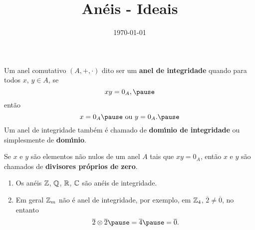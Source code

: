 \documentclass{beamer}
\title{An\'eis - Ideais}
\author[\autor]{\autor}
\institute[\instituto]{\instituto}
\date{\today}
\begin{document}
    \begin{frame}
        \maketitle
    \end{frame}

    \begin{frame}
        \begin{definicao}
            Um anel comutativo $(A, + , \cdot)$  dito ser um \textbf{anel de integridade} \pause quando para todos $x$, $y \in A$, \pause se
            \[
                xy = 0_A,\pause
            \]
            ent{\~a}o
            \[
                x = 0_A\pause \mbox{ ou } y = 0_A.\pause
            \]
            Um anel de integridade tamb{\'e}m {\'e} chamado de \textbf{dom{\'\i}nio de integridade} \pause ou simplesmente de \textbf{dom{\'\i}nio}.\pause
        \end{definicao}

        \begin{observacao}
            Se $x$ e $y$ s{\~a}o elementos n{\~a}o nulos \pause de um anel $A$ \pause tais que $xy = 0_A$, \pause ent{\~a}o $x$ e $y$ s{\~a}o chamados de \pause \textbf{divisores pr{\'o}prios de zero}.\pause
        \end{observacao}
    \end{frame}

    \begin{frame}
        \begin{exemplos}
            \begin{enumerate}[label={\arabic*})]
                \item Os an{\'e}is $\mathbb{Z}$, \pause $\mathbb{Q}$, \pause $\mathbb{R}$, \pause $\mathbb{C}$ \pause s{\~a}o an{\'e}is de integridade.\pause
                
                \vspace{.5cm}

                \item Em geral $\mathbb{Z}_m$ \pause n{\~a}o {\'e} anel de integridade, \pause por exemplo, em $\mathbb{Z}_4$, \pause $\overline{2} \neq \overline{0}$, \pause no entanto
                \[
                    \overline{2}\otimes \overline{2} \pause = \overline{4} \pause = \overline{0}.
                \]
                \vspace{.5cm}

                \seti
            \end{enumerate}
        \end{exemplos}
    \end{frame}
\end{document}
